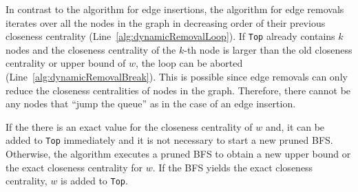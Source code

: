 In contrast to the algorithm for edge insertions, the algorithm for edge removals iterates over all the nodes in the graph in decreasing order of their previous closeness centrality (Line~\ref{alg:dynamicRemovalLoop}). If \texttt{Top} already contains $k$ nodes and the closeness centrality of the $k$-th node is larger than the old closeness centrality or upper bound of $w$, the loop can be aborted (Line~\ref{alg:dynamicRemovalBreak}). This is possible since edge removals can only reduce the closeness centralities of nodes in the graph. Therefore, there cannot be any nodes that ``jump the queue'' as in the case of an edge insertion.

If the there is an exact value for the closeness centrality of $w$ and, it can be added to \texttt{Top} immediately and it is not necessary to start a new pruned BFS. Otherwise, the algorithm executes a pruned BFS to obtain a new upper bound or the exact closeness centrality for $w$. If the BFS yields the exact closeness centrality, $w$ is added to \texttt{Top}.

